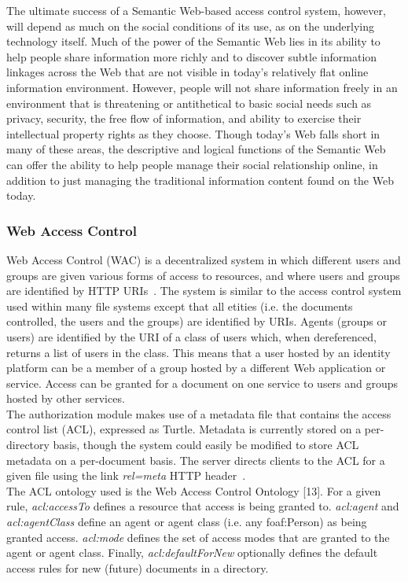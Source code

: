 The ultimate success of a Semantic Web-based access control system, however, will depend as much on the social conditions of its use, as on the underlying technology itself. Much of the power of the Semantic Web lies in its ability to help people share information more richly and to discover subtle information linkages across the Web that are not visible in today's relatively flat online information environment. However, people will not share information freely in an environment that is threatening or antithetical to basic social needs such as privacy, security, the free flow of information, and ability to exercise their intellectual property rights as they choose. Though today's Web falls short in many of these areas, the descriptive and logical functions of the Semantic Web can offer the ability to help people manage their social relationship online, in addition to just managing the traditional information content found on the Web today.\\

\subsubsection{Web Access Control}
Web Access Control (WAC) is a decentralized system in which different users and groups are given various forms of access to resources, and where users and groups are identified by HTTP URIs~\cite{hollenbach2009using}. The system is similar to the access control system used within many file systems except that all etities (i.e. the documents controlled, the users and the groups) are identified by URIs. Agents (groups or users) are identified by the URI of a class of users which, when dereferenced, returns a list of users in the class. This means that a user hosted by an identity platform can be a member of a group hosted by a different Web application or service. Access can be granted for a document on one service to users and groups hosted by other services.\\

The authorization module makes use of a metadata file that contains the access control list (ACL), expressed as Turtle. Metadata is currently stored on a per-directory basis, though the system could easily be modified to store ACL metadata on a per-document basis. The server directs clients to the ACL for a given file using the link \textit{rel=meta} HTTP header~\cite{connolly1999entity}.\\

The ACL ontology used is the Web Access Control Ontology [13]. For a given rule, \textit{acl:accessTo} defines a resource that access is being granted to. \textit{acl:agent} and \textit{acl:agentClass} define an agent or agent class (i.e. any foaf:Person) as being granted access. \textit{acl:mode} defines the set of access modes that are granted to the agent or agent class. Finally, \textit{acl:defaultForNew} optionally defines the default access rules for new (future) documents in a directory.\\

